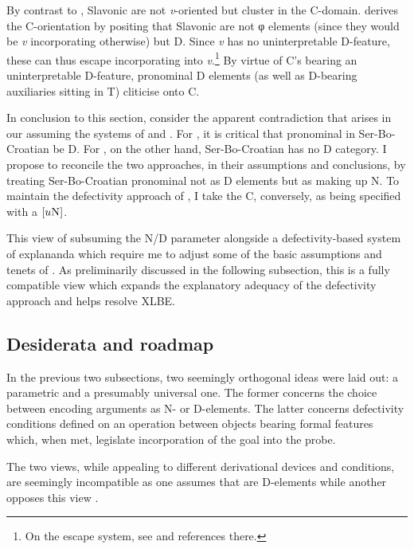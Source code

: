 \documentclass[output=paper]{langsci/langscibook}
\begin{document}
By contrast to , Slavonic  are not \emph{v}-oriented
but cluster in the C-domain. \citet{Roberts2010} derives the C-orientation by
positing that Slavonic  are not φ elements (since
they would be \emph{v} in\-cor\-po\-ra\-ting otherwise) but D.
Since \emph{v} has no uninterpretable D-feature, these 
can thus escape incorporating into \emph{v}.\footnote{On the escape system, see
\citet[391--392]{roberts:2012uq} and references there.} By virtue of C's
bearing an uninterpretable D-feature, pronominal D elements (as
well as D-bearing auxiliaries sitting in T) cliticise onto C.

In conclusion to this section, consider the apparent contradiction that arises
in our assuming the systems of \citet{Roberts2010} and \citet{Boskovic:2005}.
For \citet{Roberts2010}, it is critical that pronominal  in
Ser-Bo-Croatian be D. For \citet{Boskovic:2005},
on the other hand, Ser-Bo-Croatian has no D category. I
propose to reconcile the two approaches, in their assumptions and conclusions,
by treating Ser-Bo-Croatian pronominal  not as
D elements but as making up N. To maintain the defectivity
approach of \citet{Roberts2010}, I take the C, conversely, as being
specified with a $[u\textsc{N}]$.

This view of subsuming the N/D parameter alongside a defectivity-based system
of explananda which require me to adjust some of the basic assumptions and
tenets of \citet{Roberts2010}. As preliminarily discussed  in the following
subsection, this is a fully compatible view which expands the explanatory
adequacy of the defectivity approach and helps resolve XLBE.

\subsection{Desiderata and roadmap}
\label{subsec:road}

In the previous two subsections, two seemingly orthogonal ideas were laid out:
a parametric and a presumably universal one. The former concerns the choice
between encoding arguments as N- or D-elements. The latter concerns defectivity
conditions defined on an  operation between objects bearing formal
features which, when met, legislate incorporation of the goal into the probe.

The two views, while appealing to different derivational devices and
conditions, are seemingly incompatible as one assumes that  are
D-elements \citep{Roberts2010} while another opposes this view
\citep{Boskovic:2009b}.
\end{document}
